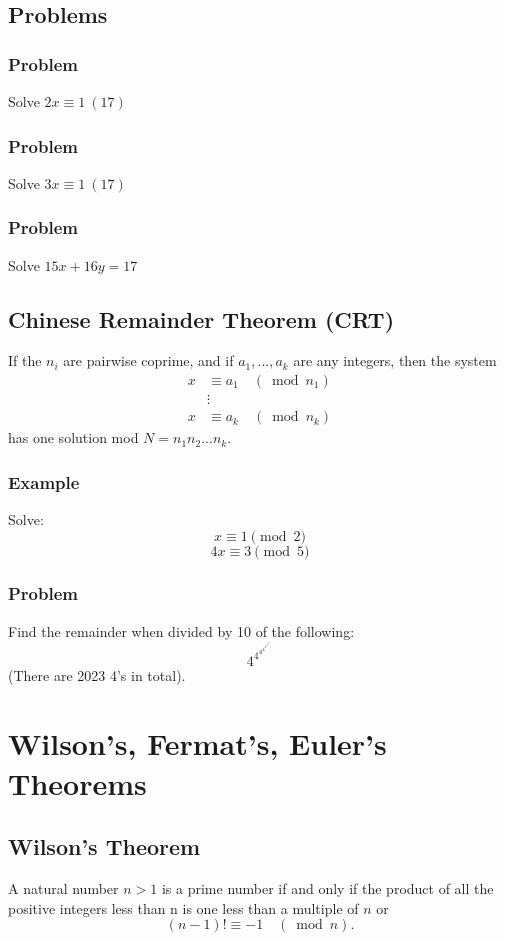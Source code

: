 \documentclass{article}
\begin{document}
\subsection{Problems}
\subsubsection{Problem}
Solve $2x\equiv 1 \ (17)$
\vspace{40px}
\subsubsection{Problem}
Solve $3x\equiv 1 \ (17)$
\vspace{40px}
\subsubsection{Problem}
Solve $15x+16y=17$
\vspace{40px}
\subsection{Chinese Remainder Theorem (CRT)}
If the $n_{i}$ are pairwise coprime, and if $a_1, ..., a_k$ are any integers, then the system
$$\begin{aligned}
    x & \equiv a_{1} \quad\left(\bmod n_{1}\right) \\
    & \vdots \\
    x & \equiv a_{k} \quad\left(\bmod n_{k}\right)
    \end{aligned}$$
has one solution mod $N=n_1 n_2 ... n_k$.
\subsubsection{Example}
Solve:
\[x\equiv 1 \pmod 2\]\[4x\equiv 3 \pmod 5\]
\vspace{50px}
\subsubsection{Problem}
Find the remainder when divided by 10 of the following:
$$4^{4^{4^{4^{4^{4^{4{...^4}}}}}}}$$
(There are 2023 4's in total).
\vspace{50px}

\section{Wilson's, Fermat's, Euler's Theorems}
\subsection{Wilson's Theorem}
A natural number $n > 1$ is a prime number if and only if the product of all the
positive integers less than n is one less than a multiple of $n$ or 
$$(n-1) ! \equiv-1 \quad(\bmod n).$$
\end{document}
